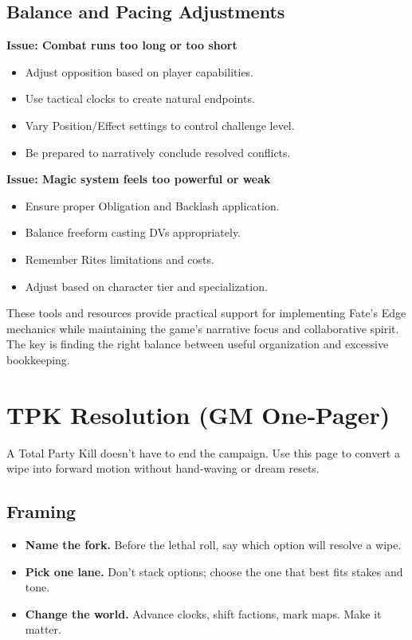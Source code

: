 \subsection{Balance and Pacing Adjustments}
\label{subsec:balance-troubleshooting}

\textbf{Issue: Combat runs too long or too short}
\begin{itemize}
\item Adjust opposition based on player capabilities.
\item Use tactical clocks to create natural endpoints.
\item Vary Position/Effect settings to control challenge level.
\item Be prepared to narratively conclude resolved conflicts.
\end{itemize}

\textbf{Issue: Magic system feels too powerful or weak}
\begin{itemize}
\item Ensure proper Obligation and Backlash application.
\item Balance freeform casting DVs appropriately.
\item Remember Rites limitations and costs.
\item Adjust based on character tier and specialization.
\end{itemize}

These tools and resources provide practical support for implementing Fate's Edge mechanics while maintaining the game's narrative focus and collaborative spirit. The key is finding the right balance between useful organization and excessive bookkeeping.



\section{TPK Resolution (GM One‑Pager)}\label{sec:tpk-onepager}

A Total Party Kill doesn’t have to end the campaign. Use this page to convert a wipe into forward motion without hand‑waving or dream resets.

\subsection*{Framing}
\begin{itemize}
\item \textbf{Name the fork.} Before the lethal roll, say which option will resolve a wipe.
\item \textbf{Pick one lane.} Don’t stack options; choose the one that best fits stakes and tone.
\item \textbf{Change the world.} Advance clocks, shift factions, mark maps. Make it matter.
\end{itemize}

